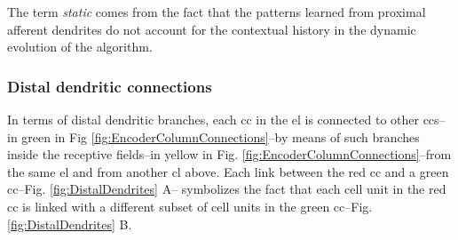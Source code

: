 \documentclass[10pt,letterpaper]{article}
\begin{document}
The term \textit{static} comes from the fact that the patterns learned from proximal afferent
dendrites do not account for the contextual history in the dynamic evolution
of the algorithm.








\subsubsection*{Distal dendritic connections}

In terms of distal dendritic branches, each \gls{cc} in the \gls{el} is connected to other \glspl{cc}--in green in Fig \ref{fig:EncoderColumnConnections}--by means of such
branches inside the receptive fields--in yellow in Fig. \ref{fig:EncoderColumnConnections}--from the same \gls{el} and from another \gls{cl}
above.
Each link between the red \gls{cc} and a green \gls{cc}--Fig. \ref{fig:DistalDendrites} A--
symbolizes the fact that each cell unit in
the red \gls{cc} is linked with a different subset of cell units in the green \gls{cc}--Fig. \ref{fig:DistalDendrites} B.
\end{document}

